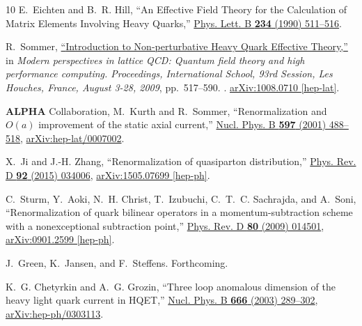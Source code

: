 \begin{thebibliography}{10}
E.~Eichten and B.~R. Hill, ``{An Effective Field Theory for the Calculation of
  Matrix Elements Involving Heavy Quarks},''
\href{http://dx.doi.org/10.1016/0370-2693(90)92049-O}{Phys. Lett. B {\bfseries
  234} (1990) 511--516}.

R.~Sommer,
  \href{http://dx.doi.org/10.1093/acprof:oso/9780199691609.003.0009}{``{Introduction
  to Non-perturbative Heavy Quark Effective Theory},''} in {\em {Modern
  perspectives in lattice QCD: Quantum field theory and high performance
  computing. Proceedings, International School, 93rd Session, Les Houches,
  France, August 3-28, 2009}}, pp.~517--590.
.
\newblock
\href{http://arxiv.org/abs/1008.0710}{{\ttfamily arXiv:1008.0710 [hep-lat]}}.
\newblock

{\bfseries ALPHA} Collaboration, M.~Kurth and R.~Sommer, ``{Renormalization and
  $O(a)$ improvement of the static axial current},''
  \href{http://dx.doi.org/10.1016/S0550-3213(00)00750-1}{Nucl. Phys. B
  {\bfseries 597} (2001) 488--518},
\href{http://arxiv.org/abs/hep-lat/0007002}{{\ttfamily arXiv:hep-lat/0007002}}.

X.~Ji and J.-H. Zhang, ``{Renormalization of quasiparton distribution},''
  \href{http://dx.doi.org/10.1103/PhysRevD.92.034006}{Phys. Rev. D {\bfseries
  92} (2015) 034006},
\href{http://arxiv.org/abs/1505.07699}{{\ttfamily arXiv:1505.07699 [hep-ph]}}.

C.~Sturm, Y.~Aoki, N.~H. Christ, T.~Izubuchi, C.~T.~C. Sachrajda, and A.~Soni,
  ``{Renormalization of quark bilinear operators in a momentum-subtraction
  scheme with a nonexceptional subtraction point},''
  \href{http://dx.doi.org/10.1103/PhysRevD.80.014501}{Phys. Rev. D {\bfseries
  80} (2009) 014501},
\href{http://arxiv.org/abs/0901.2599}{{\ttfamily arXiv:0901.2599 [hep-ph]}}.

J.~Green, K.~Jansen, and F.~Steffens. Forthcoming.

K.~G. Chetyrkin and A.~G. Grozin, ``{Three loop anomalous dimension of the
  heavy light quark current in HQET},''
  \href{http://dx.doi.org/10.1016/S0550-3213(03)00490-5}{Nucl. Phys. B
  {\bfseries 666} (2003) 289--302},
\href{http://arxiv.org/abs/hep-ph/0303113}{{\ttfamily arXiv:hep-ph/0303113}}.


\end{thebibliography}
